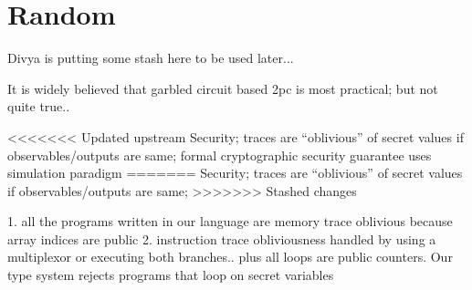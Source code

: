 \section{Random}

Divya is putting some stash here to be used later...


 It is widely believed that garbled circuit based 2pc is most practical; but not quite true..

<<<<<<< Updated upstream
 Security; traces are ``oblivious'' of secret values if observables/outputs are same; formal cryptographic security guarantee uses simulation paradigm 
=======
 Security; traces are ``oblivious'' of secret values if observables/outputs are same; 
>>>>>>> Stashed changes


 1. all the programs written in our language are memory trace oblivious because array indices are public 2. instruction trace obliviousness handled by using a multiplexor or executing both branches.. plus all loops are public counters. Our type system rejects programs that loop on secret variables



